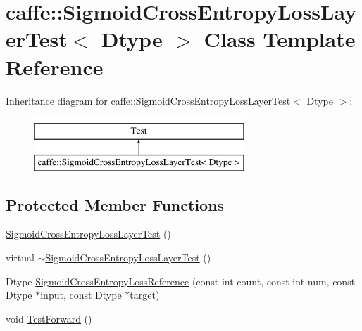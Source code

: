 \hypertarget{classcaffe_1_1_sigmoid_cross_entropy_loss_layer_test}{\section{caffe\+:\+:Sigmoid\+Cross\+Entropy\+Loss\+Layer\+Test$<$ Dtype $>$ Class Template Reference}
\label{classcaffe_1_1_sigmoid_cross_entropy_loss_layer_test}
}
Inheritance diagram for caffe\+:\+:Sigmoid\+Cross\+Entropy\+Loss\+Layer\+Test$<$ Dtype $>$\+:\begin{figure}[H]
\begin{center}
\leavevmode
\includegraphics[height=2.000000cm]{classcaffe_1_1_sigmoid_cross_entropy_loss_layer_test}
\end{center}
\end{figure}
\subsection*{Protected Member Functions}
\begin{DoxyCompactItemize}
\item 
\hyperlink{classcaffe_1_1_sigmoid_cross_entropy_loss_layer_test_a5eb84244e247c0a7f65c01b3c489edba}{Sigmoid\+Cross\+Entropy\+Loss\+Layer\+Test} ()
\item 
virtual \hyperlink{classcaffe_1_1_sigmoid_cross_entropy_loss_layer_test_a5b4a2d0f4e088577502b4f8c6babe330}{$\sim$\+Sigmoid\+Cross\+Entropy\+Loss\+Layer\+Test} ()
\item 
Dtype \hyperlink{classcaffe_1_1_sigmoid_cross_entropy_loss_layer_test_ad48cf1eb41361e5984d49b96e0aae371}{Sigmoid\+Cross\+Entropy\+Loss\+Reference} (const int count, const int num, const Dtype $\ast$input, const Dtype $\ast$target)
\item 
void \hyperlink{classcaffe_1_1_sigmoid_cross_entropy_loss_layer_test_a6df1997b837b1e37bdbadb73e1fd99b7}{Test\+Forward} ()
\end{DoxyCompactItemize}
